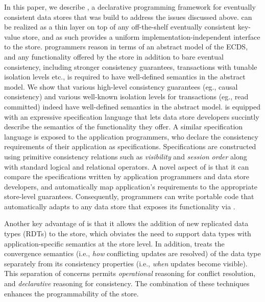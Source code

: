 In this paper, we describe \name, a declarative programming framework
for eventually consistent data stores that was build to address the
issues discussed above. \name can be realized as a thin layer on top
of any off-the-shelf eventually consistent key-value store, and as
such provides a uniform implementation-independent interface to the
store. \name programmers reason in terms of an abstract model of the
ECDS, and any functionality offered by the store in addition to bare
eventual consistency, including stronger consistency guarantees,
transactions with tunable isolation levels etc., is required to have
well-defined semantics in the abstract model. We show that various
high-level consistency guarantees (eg., causal consistency) and
various well-known isolation levels for transactions (eg., read
committed) indeed have well-defined semantics in the abstract model.
\name is equipped with an expressive specification language that lets
data store developers succintly describe the semantics of the
functionality they offer. A similar specification language is exposed
to the application programmers, who declare the consistency
requirements of their application as specifications. Specifications
are constructed using primitive consistency relations such as
\emph{visibility} and \emph{session order} along with standard logical
and relational operators. A novel aspect of \name is that it can
compare the specifications written by application programmers and data
store developers, and automatically map application's requirements to
the appropriate store-level guarantees. Consequently, \name
programmers can write portable code that automatically adapts to any
data store that exposes its functionality via \name. 

Another key advantage of \name is that it allows the addition of new
replicated data types (RDTs) to the store, which obviates the need to
support data types with application-specific semantics at the store
level. In addition, \name treats the convergence semantics (i.e.,
\emph{how} conflicting updates are resolved) of the data type
separately from its consistency properties (i.e., \emph{when} updates
become visible).  This separation of concerns permits
\emph{operational} reasoning for conflict resolution, and
\emph{declarative} reasoning for consistency.  The combination of
these techniques enhances the programmability of the store.

